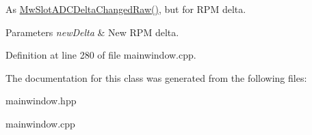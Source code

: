 As \hyperlink{class_main_window_acbdfd3592779f6946c4fecc33c79e9a4}{Mw\+Slot\+A\+D\+C\+Delta\+Changed\+Raw()}, but for R\+PM delta. 


\begin{DoxyParams}{Parameters}
{\em new\+Delta} & New R\+PM delta. \\
\hline
\end{DoxyParams}


Definition at line 280 of file mainwindow.\+cpp.



The documentation for this class was generated from the following files\+:\begin{DoxyCompactItemize}
\item 
mainwindow.\+hpp\item 
mainwindow.\+cpp\end{DoxyCompactItemize}
